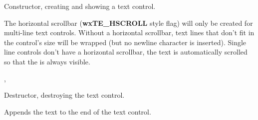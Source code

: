 Constructor, creating and showing a text control.











The horizontal scrollbar ({\bf wxTE\_HSCROLL} style flag) will only be created for multi-line text controls.
Without a horizontal scrollbar, text lines that don't fit in the control's
size will be wrapped (but no newline character is inserted). Single line
controls don't have a horizontal scrollbar, the text is automatically scrolled
so that the  is always
visible.



, 



Destructor, destroying the text control.

\label{wxtextctrlappendtext}


Appends the text to the end of the text control.




